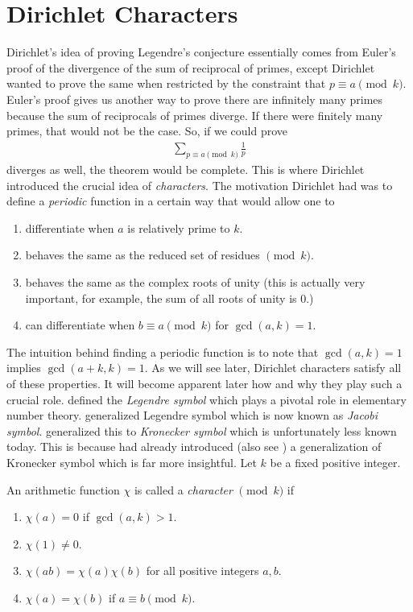 \documentclass[elemannt.tex]{subfile}
\begin{document}
	\section{Dirichlet Characters}
	Dirichlet's idea of proving Legendre's conjecture essentially comes from Euler's proof of the divergence of the sum of reciprocal of primes, except Dirichlet wanted to prove the same when restricted by the constraint that $p\equiv a\pmod{k}$. Euler's proof gives us another way to prove there are infinitely many primes because the sum of reciprocals of primes diverge. If there were finitely many primes, that would not be the case. So, if we could prove
		\begin{align*}
			\sum_{p\equiv a\pmod{k}}\frac{1}{p}
		\end{align*}
	diverges as well, the theorem would be complete. This is where Dirichlet introduced the crucial idea of \textit{characters}. The motivation Dirichlet had was to define a \textit{periodic} function in a certain way that would allow one to
		\begin{enumerate}
			\item differentiate when $a$ is relatively prime to $k$.
			\item behaves the same as the reduced set of residues $\pmod{k}$.
			\item behaves the same as the complex roots of unity (this is actually very important, for example, the sum of all roots of unity is $0$.)
			\item can differentiate when $b\equiv a\pmod{k}$ for $\gcd(a,k)=1$.
		\end{enumerate}
	The intuition behind finding a periodic function is to note that $\gcd(a,k)=1$ implies $\gcd(a+k,k)=1$. As we will see later, Dirichlet characters satisfy all of these properties. It will become apparent later how and why they play such a crucial role. \textcite[pp. 186]{legendre_1798} defined the \textit{Legendre symbol} which plays a pivotal role in elementary number theory. \textcite{jacobi_1846} generalized Legendre symbol which is now known as \textit{Jacobi symbol}. \textcite[pp. 770]{kronecker_1885} generalized this to \textit{Kronecker symbol} which is unfortunately less known today. This is because \textcite{dirichlet_1837} had already introduced (also see \textcite{dirichlet_1897_21}) a generalization of Kronecker symbol which is far more insightful. Let $k$ be a fixed positive integer.
		\begin{definition}
			An arithmetic function $\chi$ is called a \textit{character} $\pmod{k}$ if
				\begin{enumerate}
					\item $\chi(a)=0$ if $\gcd(a,k)>1$.
					\item $\chi(1)\neq0$.
					\item $\chi(ab)=\chi(a)\chi(b)$ for all positive integers $a,b$.
					\item $\chi(a)=\chi(b)$ if $a\equiv b\pmod{k}$.
				\end{enumerate}
		\end{definition}
\end{document}
